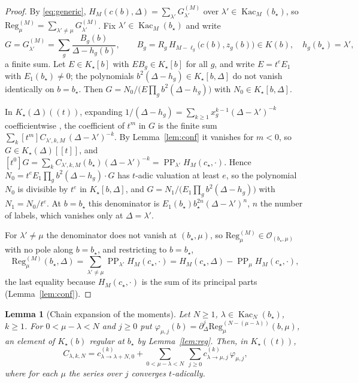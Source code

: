 \documentclass[11pt]{article}
\newtheorem{lemma}[theorem]{Lemma}
\theoremstyle{definition}
\theoremstyle{remark}
\newcommand{\PP}{\operatorname{PP}}
\newcommand{\Kac}{\operatorname{Kac}}
\begin{document}
\begin{proof}
By \eqref{eq:generic}, $H_M(c(b),\Delta)=\sum_{\lambda'}G^{(M)}_{\lambda'}$
over $\lambda'\in\Kac_M(b_\star)$, so
$\mathrm{Reg}^{(M)}_\mu=\sum_{\lambda'\ne\mu}G^{(M)}_{\lambda'}$.  Fix
$\lambda'\in\Kac_M(b_\star)$ and write
\[
 G=G^{(M)}_{\lambda'}=\sum_g\frac{B_g(b)}{\Delta-h_g(b)},\qquad
 B_g=R_g\,H_{M-\ell_g}\bigl(c(b),z_g(b)\bigr)\in K(b),\quad h_g(b_\star)=\lambda',
\]
a finite sum.  Let $E\in K_\star[b]$ with $EB_g\in K_\star[b]$ for all $g$, and
write $E=t^eE_1$ with $E_1(b_\star)\ne0$; the polynomials
$b^2(\Delta-h_g)\in K_\star[b,\Delta]$ do not vanish identically on $b=b_\star$.
Then $G=N_0/\bigl(E\prod_gb^2(\Delta-h_g)\bigr)$ with
$N_0\in K_\star[b,\Delta]$.

In $K_\star(\Delta)((t))$, expanding $1/(\Delta-h_g)=\sum_{k\ge1}x_g^{k-1}
(\Delta-\lambda')^{-k}$ coefficientwise \cite[Lemma~7.4]{CP}, the coefficient
of $t^m$ in $G$ is the finite sum $\sum_k[t^m]C_{\lambda',k,M}\,
(\Delta-\lambda')^{-k}$.  By Lemma~\ref{lem:conf} it vanishes for $m<0$, so
$G\in K_\star(\Delta)[[t]]$, and $[t^0]G=\sum_kC_{\lambda',k,M}(b_\star)
(\Delta-\lambda')^{-k}=\PP_{\lambda'}H_M(c_\star,\cdot)$.  Hence
$N_0=t^eE_1\prod_gb^2(\Delta-h_g)\cdot G$ has $t$-adic valuation at least $e$,
so the polynomial $N_0$ is divisible by $t^e$ in $K_\star[b,\Delta]$, and
$G=N_1/\bigl(E_1\prod_gb^2(\Delta-h_g)\bigr)$ with $N_1=N_0/t^e$.  At
$b=b_\star$ this denominator is $E_1(b_\star)b_\star^{2n}(\Delta-\lambda')^n$,
$n$ the number of labels, which vanishes only at $\Delta=\lambda'$.

For $\lambda'\ne\mu$ the denominator does not vanish at $(b_\star,\mu)$, so
$\mathrm{Reg}^{(M)}_\mu\in\mathcal O_{(b_\star,\mu)}$ with no pole along
$b=b_\star$, and restricting to $b=b_\star$,
\[
 \mathrm{Reg}^{(M)}_\mu(b_\star,\Delta)=\sum_{\lambda'\ne\mu}\PP_{\lambda'}
 H_M(c_\star,\cdot)=H_M(c_\star,\Delta)-\PP_\mu H_M(c_\star,\cdot),
\]
the last equality because $H_M(c_\star,\cdot)$ is the sum of its principal
parts (Lemma~\ref{lem:conf}).
\end{proof}

\begin{lemma}[Chain expansion of the moments]\label{lem:expand}
Let $N\ge1$, $\lambda\in\Kac_N(b_\star)$, $k\ge1$.  For $0<\mu-\lambda<N$ and
$j\ge0$ put $\varphi_{\mu,j}(b)=\partial_\Delta^j\mathrm{Reg}^{(N-(\mu-\lambda))}_\mu(b,\mu)$,
an element of $K_\star(b)$ regular at $b_\star$ by Lemma~\ref{lem:reg}.  Then,
in $K_\star((t))$,
\begin{equation}\label{eq:expand}
 C_{\lambda,k,N}=c^{(k)}_{\lambda\to\lambda+N,0}
 +\sum_{0<\mu-\lambda<N}\ \sum_{j\ge0}c^{(k)}_{\lambda\to\mu,j}\,\varphi_{\mu,j},
\end{equation}
where for each $\mu$ the series over $j$ converges $t$-adically.
\end{lemma}
\end{document}
